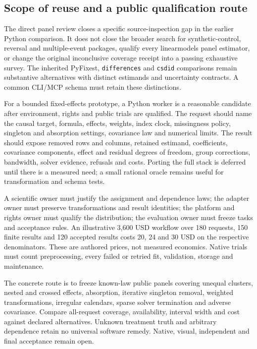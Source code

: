 \subsection{Scope of reuse and a public qualification route}
The direct panel review closes a specific source-inspection gap in the
earlier Python comparison. It does not close the broader search for
synthetic-control, reversal and multiple-event packages, qualify every
linearmodels panel estimator, or change the original inconclusive coverage
receipt into a passing exhaustive survey. The inherited PyFixest,
\texttt{differences} and \texttt{csdid} comparisons remain substantive
alternatives with distinct estimands and uncertainty contracts. A common
CLI/MCP schema must retain these distinctions.
\citep{exec24_lmpanel_reference}

For a bounded fixed-effects prototype, a Python worker is a reasonable
candidate after environment, rights and public trials are qualified.
The request should name the causal target, formula, effects, weights,
index clock, missingness policy, singleton and absorption settings,
covariance law and numerical limits. The result should expose removed rows
and columns, retained estimand, coefficients, covariance components,
effect and residual degrees of freedom, group corrections, bandwidth,
solver evidence, refusals and costs. Porting the full stack is deferred
until there is a measured need; a small rational oracle remains useful
for transformation and schema tests.\citep{exec24_lmpanel_reference}

A scientific owner must justify the assignment and dependence laws; the
adapter owner must preserve transformations and result identities; the
platform and rights owner must qualify the distribution; the evaluation
owner must freeze tasks and acceptance rules. An illustrative 3,600 USD
workflow over 180 requests, 150 finite results and 120 accepted results
costs 20, 24 and 30 USD on the respective denominators. These are authored
prices, not measured economics. Native trials must count preprocessing,
every failed or retried fit, validation, storage and maintenance.
\citep{exec24_lmpanel_reference}

The concrete route is to freeze known-law public panels covering unequal
clusters, nested and crossed effects, absorption, iterative singleton
removal, weighted transformations, irregular calendars, sparse solver
termination and adverse covariance. Compare all-request coverage,
availability, interval width and cost against declared alternatives.
Unknown treatment truth and arbitrary dependence retain no universal
software remedy. Native, visual, independent and final acceptance remain open.
\citep{exec24_lmpanel_reference}
